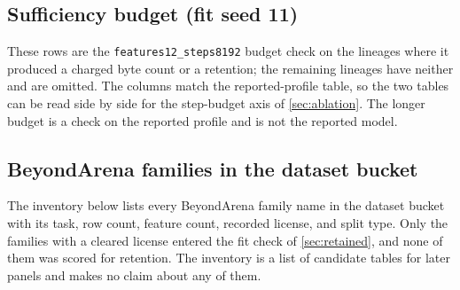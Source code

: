 \documentclass{article}
\begin{document}
\subsection{Sufficiency budget (fit seed 11)}
\label{app:8192}
These rows are the \texttt{features12\_\allowbreak{}steps8192} budget check on the lineages where it produced a charged byte count or a retention; the remaining lineages have neither and are omitted. The columns match the reported-profile table, so the two tables can be read side by side for the step-budget axis of \cref{sec:ablation}. The longer budget is a check on the reported profile and is not the reported model.
\begingroup\scriptsize\setlength{\tabcolsep}{2pt}

\endgroup

\subsection{BeyondArena families in the dataset bucket}
\label{app:beyond}
The inventory below lists every BeyondArena family name in the dataset bucket with its task, row count, feature count, recorded license, and split type. Only the families with a cleared license entered the fit check of \cref{sec:retained}, and none of them was scored for retention. The inventory is a list of candidate tables for later panels and makes no claim about any of them.
\begingroup\setlength{\tabcolsep}{2pt}

\endgroup
\end{document}
